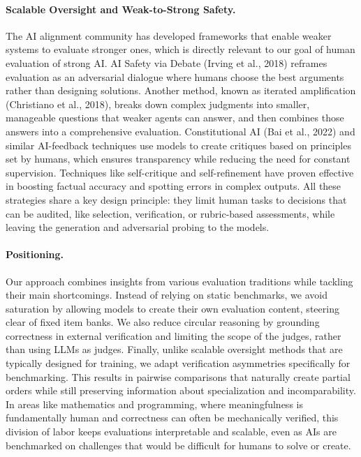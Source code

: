 \documentclass{article} %
\begin{document}
\paragraph{Scalable Oversight and Weak-to-Strong Safety.}
The AI alignment community has developed frameworks that enable weaker systems to evaluate stronger ones, which is directly relevant to our goal of human evaluation of strong AI. AI Safety via Debate (Irving et al., 2018) reframes evaluation as an adversarial dialogue where humans choose the best arguments rather than designing solutions. Another method, known as iterated amplification (Christiano et al., 2018), breaks down complex judgments into smaller, manageable questions that weaker agents can answer, and then combines those answers into a comprehensive evaluation.
Constitutional AI (Bai et al., 2022) and similar AI-feedback techniques use models to create critiques based on principles set by humans, which ensures transparency while reducing the need for constant supervision. Techniques like self-critique and self-refinement have proven effective in boosting factual accuracy and spotting errors in complex outputs.  All these strategies share a key design principle: they limit human tasks to decisions that can be audited, like selection, verification, or rubric-based assessments, while leaving the generation and adversarial probing to the models.


\paragraph{Positioning.}
Our approach combines insights from various evaluation traditions while tackling their main shortcomings. Instead of relying on static benchmarks, we avoid saturation by allowing models to create their own evaluation content, steering clear of fixed item banks. We also reduce circular reasoning by grounding correctness in external verification and limiting the scope of the judges, rather than using LLMs as judges. Finally, unlike scalable oversight methods that are typically designed for training, we adapt verification asymmetries specifically for benchmarking. This results in pairwise comparisons that naturally create partial orders while still preserving information about specialization and incomparability. In areas like mathematics and programming, where meaningfulness is fundamentally human and correctness can often be mechanically verified, this division of labor keeps evaluations interpretable and scalable, even as AIs are benchmarked on challenges that would be difficult for humans to solve or create.
\end{document}
